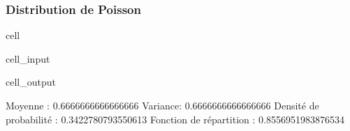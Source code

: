 \documentclass[letterpaper,10pt,english]{jupyterBook}
\begin{document}
\subsubsection{Distribution de Poisson}
\label{\detokenize{elemstats:distribution-de-poisson}}
\begin{sphinxuseclass}{cell}\begin{sphinxVerbatimInput}

\begin{sphinxuseclass}{cell_input}
\begin{sphinxVerbatim}[commandchars=\\\{\}]
   

   
   

 
 
  
  
\end{sphinxVerbatim}

\end{sphinxuseclass}\end{sphinxVerbatimInput}
\begin{sphinxVerbatimOutput}

\begin{sphinxuseclass}{cell_output}
\begin{sphinxVerbatim}[commandchars=\\\{\}]
Moyenne :  0.6666666666666666
Variance:  0.6666666666666666
Densité de probabilité :  0.3422780793550613
Fonction de répartition :  0.8556951983876534
\end{sphinxVerbatim}

\end{sphinxuseclass}\end{sphinxVerbatimOutput}

\end{sphinxuseclass}
\end{document}
